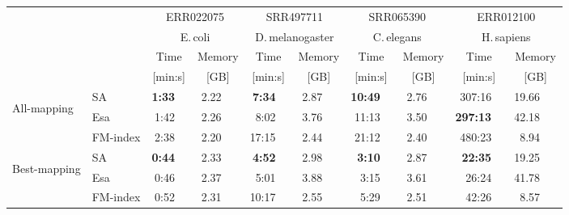\begin{tabular}{llrrrrrrrr}
  \toprule
  & \multirow{2}{*}{}  &\multicolumn{ 2 }{c}{  ERR022075 } &\multicolumn{ 2 }{c}{  SRR497711 } &\multicolumn{ 2 }{c}{  SRR065390 } &\multicolumn{ 2 }{c}{  ERR012100 } \\
  &&\multicolumn{2}{c}{E.\,coli}&\multicolumn{2}{c}{D.\,melanogaster}&\multicolumn{2}{c}{C.\,elegans}&\multicolumn{2}{c}{H.\,sapiens} \\
  \cmidrule(lr){3-4}\cmidrule(lr){5-6}\cmidrule(lr){7-8}\cmidrule(lr){9-10} 
  &  &\multicolumn{1}{c}{  Time } &\multicolumn{1}{c}{  Memory } &\multicolumn{1}{c}{  Time } &\multicolumn{1}{c}{  Memory } &\multicolumn{1}{c}{  Time } &\multicolumn{1}{c}{  Memory } &\multicolumn{1}{c}{  Time } &\multicolumn{1}{c}{  Memory } \\
  &   &\multicolumn{1}{c}{  [min:s] } &\multicolumn{1}{c}{  [GB] } &\multicolumn{1}{c}{  [min:s] } &\multicolumn{1}{c}{  [GB] } &\multicolumn{1}{c}{  [min:s] } &\multicolumn{1}{c}{  [GB] } &\multicolumn{1}{c}{  [min:s] } &\multicolumn{1}{c}{  [GB] } \\
  \midrule
\multirow{3}{*}{\begin{sideways}\scriptsize All-mapping \end{sideways}} &  SA  & \phantom{000}\textbf{1:33}\ \  & 2.22\ \ \  & \phantom{000}\textbf{7:34}\ \  & 2.87\ \ \  & \phantom{00}\textbf{10:49}\ \  & 2.76\ \ \  & \phantom{0}307:16\ \  & 19.66\ \ \  \\ 
    &  Esa  & \phantom{000}1:42\ \  & 2.26\ \ \  & \phantom{000}8:02\ \  & 3.76\ \ \  & \phantom{00}11:13\ \  & 3.50\ \ \  & \phantom{0}\textbf{297:13}\ \  & 42.18\ \ \  \\ 
     &  FM-index  & \phantom{000}2:38\ \  & 2.20\ \ \  & \phantom{00}17:15\ \  & 2.44\ \ \  & \phantom{00}21:12\ \  & 2.40\ \ \  & \phantom{0}480:23\ \  & 8.94\ \ \  \\ 
  \midrule\multirow{3}{*}{\begin{sideways}\scriptsize Best-mapping \end{sideways}} &  SA   & \phantom{000}\textbf{0:44}\ \  & 2.33\ \ \  & \phantom{000}\textbf{4:52}\ \  & 2.98\ \ \  & \phantom{000}\textbf{3:10}\ \  & 2.87\ \ \  & \phantom{00}\textbf{22:35}\ \  & 19.25\ \ \  \\ 
      &  Esa   & \phantom{000}0:46\ \  & 2.37\ \ \  & \phantom{000}5:01\ \  & 3.88\ \ \  & \phantom{000}3:15\ \  & 3.61\ \ \  & \phantom{00}26:24\ \  & 41.78\ \ \  \\ 
       &  FM-index   & \phantom{000}0:52\ \  & 2.31\ \ \  & \phantom{00}10:17\ \  & 2.55\ \ \  & \phantom{000}5:29\ \  & 2.51\ \ \  & \phantom{00}42:26\ \  & 8.57\ \ \  \\ 
   \bottomrule
\end{tabular}
